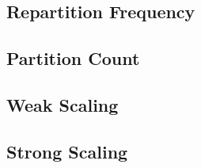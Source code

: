 \subsection{Repartition Frequency}

\subsection{Partition Count}

\subsection{Weak Scaling}

\subsection{Strong Scaling}
